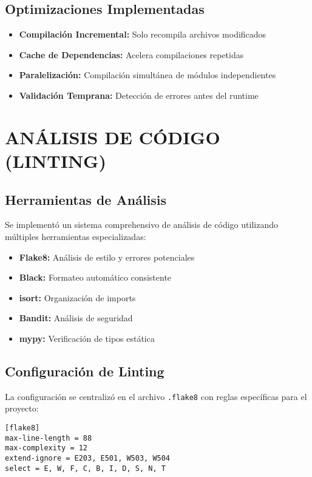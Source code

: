 \documentclass[12pt,a4paper]{article}
\begin{document}
\subsection{Optimizaciones Implementadas}

\begin{itemize}
    \item \textbf{Compilación Incremental:} Solo recompila archivos modificados
    \item \textbf{Cache de Dependencias:} Acelera compilaciones repetidas
    \item \textbf{Paralelización:} Compilación simultánea de módulos independientes
    \item \textbf{Validación Temprana:} Detección de errores antes del runtime
\end{itemize}

\section{ANÁLISIS DE CÓDIGO (LINTING)}

\subsection{Herramientas de Análisis}

Se implementó un sistema comprehensivo de análisis de código utilizando múltiples herramientas especializadas:

\begin{itemize}
    \item \textbf{Flake8:} Análisis de estilo y errores potenciales
    \item \textbf{Black:} Formateo automático consistente
    \item \textbf{isort:} Organización de imports
    \item \textbf{Bandit:} Análisis de seguridad
    \item \textbf{mypy:} Verificación de tipos estática
\end{itemize}

\subsection{Configuración de Linting}

La configuración se centralizó en el archivo \texttt{.flake8} con reglas específicas para el proyecto:

\begin{verbatim}
[flake8]
max-line-length = 88
max-complexity = 12
extend-ignore = E203, E501, W503, W504
select = E, W, F, C, B, I, D, S, N, T
\end{verbatim}
\end{document}

